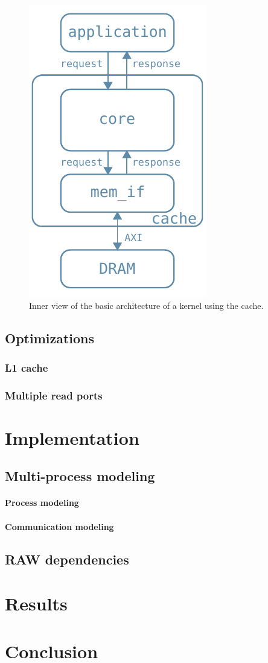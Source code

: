 \documentclass[11pt,a4paper]{memoir}
\begin{document}
\begin{figure}
	\centering
	\includegraphics[width=.3\textwidth]{basic_arch_inner}
	\caption{Inner view of the basic architecture of a kernel using the cache.}
	\label{fig:basic_arch_inner}
\end{figure}

\section{Optimizations}
\subsection{L1 cache}
\subsection{Multiple read ports}

\chapter{Implementation}
\section{Multi-process modeling}
\subsubsection{Process modeling}
\subsubsection{Communication modeling}
\section{RAW dependencies}

\chapter{Results}
\chapter{Conclusion}
\end{document}

